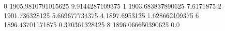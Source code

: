 0 1905.9810791015625 9.9144287109375
1 1903.683837890625 7.6171875
2 1901.736328125 5.669677734375
4 1897.6953125 1.628662109375
6 1896.43701171875 0.370361328125
8 1896.066650390625 0.0
